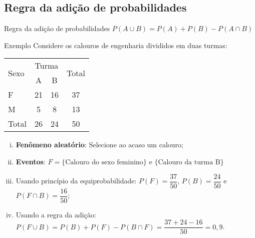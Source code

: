 \documentclass[9pt]{beamer}
\begin{document}
\subsection{Regra da adição de probabilidades}
\begin{frame}{}
\begin{block}{Regra da adição de probabilidades}
	$P(A \cup B) = P(A) + P(B) - P(A \cap B) $
\end{block}
\begin{block}{Exemplo}
	Considere os calouros de engenharia divididos em duas turmas:
	{\scriptsize
	\begin{table}[ht]
		\centering
		\begin{tabular}{l|cc|c}
			\toprule[0.05cm]
			\multirow{2}{*}{Sexo} & \multicolumn{2}{|c|}{Turma} & \multirow{2}{*}{Total} \\ \cmidrule{2-3}
			 & A & B &  \\ 
			\midrule[0.05cm]
			F & 21 & 16 & 37 \\ 
			M & 5 & 8 & 13 \\ \midrule[0.05cm] 
			Total & 26 & 24 & 50 \\ 
			\bottomrule[0.05cm]
		\end{tabular}
	\end{table}
	}


	\begin{enumerate}[i.]
		\item \textbf{Fenômeno aleatório}: Selecione ao acaso um calouro;
		\item \textbf{Eventos}: $F=\{\mbox{Calouro do sexo feminino}\}$ e $\{\mbox{Calouro da turma B}\}$
		\item Usando princípio da equiprobabilidade: $P(F)=\dfrac{37}{50}$, $P(B)=\dfrac{24}{50}$ e $P(F \cap B) = \dfrac{16}{50}$;
		\item Usando a regra da adição: $P(F \cup B) = P(B) + P(F)  - P(B \cap F) = \dfrac{37+24-16}{50}= 0,9$.
	\end{enumerate}
\end{block}
\end{frame}

\end{document}
